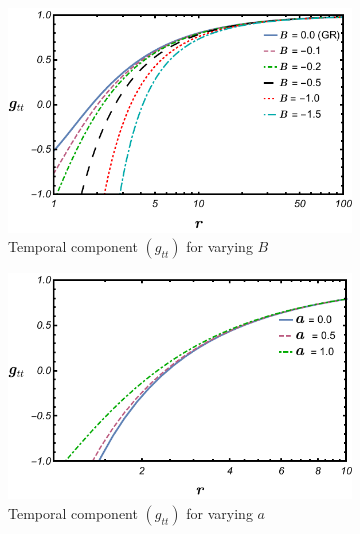 \documentclass[12pt,a4paper,oneside]{book}
\begin{document}
\begin{figure}[t]
	\begin{subfigure}[b]{0.5\textwidth}
         \centering
         \includegraphics[width=\textwidth]{temporal_var_B_a.pdf}
	\caption{Temporal component $(g_{tt})$ for varying $B$}
    		\label{temporal_var_B_a}
     \end{subfigure}
    \hfill
     \begin{subfigure}[b]{0.5\textwidth}
         \centering
         \includegraphics[width=\textwidth]{temporal_var_a_B.pdf}
	\caption{Temporal component $(g_{tt})$ for varying $a$}
    		\label{temporal_var_a_B}
     \end{subfigure}
     \newline
	\newline
     \begin{subfigure}[b]{0.5\textwidth}
         \centering

\end{subfigure}
\end{figure}
\end{document}
